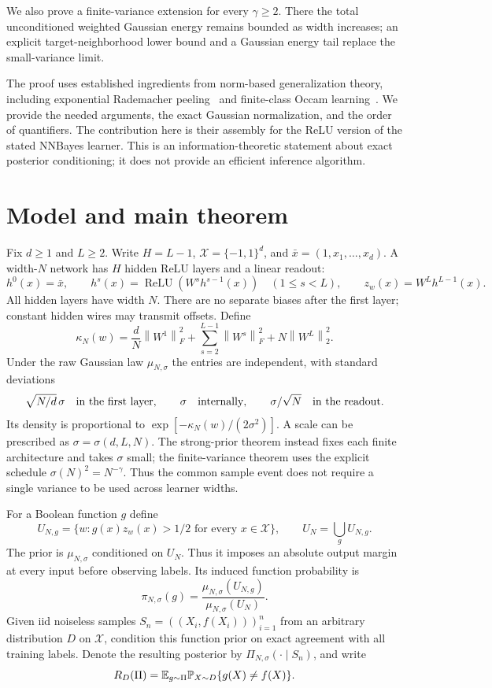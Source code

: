 \documentclass[11pt]{article}
\theoremstyle{remark}\newtheorem{remark}[theorem]{Remark}
\newcommand{\relu}{\operatorname{ReLU}}
\newcommand{\norm}[1]{\left\lVert#1\right\rVert}
\newcommand{\cX}{\mathcal X}\newcommand{\cF}{\mathcal F}\newcommand{\cG}{\mathcal G}
\begin{document}
We also prove a finite-variance extension for every $\gamma\ge2$. There the total unconditioned weighted Gaussian energy remains bounded as width increases; an explicit target-neighborhood lower bound and a Gaussian energy tail replace the small-variance limit.

The proof uses established ingredients from norm-based generalization theory, including exponential Rademacher peeling~\cite{golowich} and finite-class Occam learning~\cite{blumer}. We provide the needed arguments, the exact Gaussian normalization, and the order of quantifiers. The contribution here is their assembly for the ReLU version of the stated NNBayes learner. This is an information-theoretic statement about exact posterior conditioning; it does not provide an efficient inference algorithm.

\section{Model and main theorem}
Fix $d\ge1$ and $L\ge2$. Write $H=L-1$, $\cX=\{-1,1\}^d$, and $\bar x=(1,x_1,\ldots,x_d)$. A width-$N$ network has $H$ hidden ReLU layers and a linear readout:
\[
 h^0(x)=\bar x,\qquad h^s(x)=\relu(W^s h^{s-1}(x))\quad(1\le s<L),
 \qquad z_w(x)=W^Lh^{L-1}(x).
\]
All hidden layers have width $N$. There are no separate biases after the first layer; constant hidden wires may transmit offsets. Define
\[
 \kappa_N(w)=\frac dN\norm{W^1}_F^2+
 \sum_{s=2}^{L-1}\norm{W^s}_F^2+N\norm{W^L}_2^2.
\]
Under the raw Gaussian law $\mu_{N,\sigma}$ the entries are independent, with standard deviations
\[
 \sqrt{N/d}\,\sigma\quad\hbox{in the first layer},\qquad
 \sigma\quad\hbox{internally},\qquad
 \sigma/\sqrt N\quad\hbox{in the readout}.
\]
Its density is proportional to $\exp[-\kappa_N(w)/(2\sigma^2)]$.
A scale can be prescribed as $\sigma=\sigma(d,L,N)$. The strong-prior
theorem instead fixes each finite architecture and takes $\sigma$ small;
the finite-variance theorem uses the explicit schedule
$\sigma(N)^2=N^{-\gamma}$. Thus the common sample event does not require
a single variance to be used across learner widths.

For a Boolean function $g$ define
\[
 U_{N,g}=\{w:g(x)z_w(x)>1/2\text{ for every }x\in\cX\},
 \qquad U_N=\bigcup_g U_{N,g}.
\]
The prior is $\mu_{N,\sigma}$ conditioned on $U_N$. Thus it imposes an absolute output margin at every input before observing labels. Its induced function probability is
\[
 \pi_{N,\sigma}(g)=\frac{\mu_{N,\sigma}(U_{N,g})}{\mu_{N,\sigma}(U_N)}.
\]
Given iid noiseless samples $S_n=((X_i,f(X_i)))_{i=1}^n$ from an arbitrary distribution $D$ on $\cX$, condition this function prior on exact agreement with all training labels. Denote the resulting posterior by $\Pi_{N,\sigma}(\cdot\mid S_n)$, and write
\[
 R_D(\Pi)=\mathbb E_{g\sim\Pi}\mathbb P_{X\sim D}\{g(X)\ne f(X)\}.
\]
\end{document}
